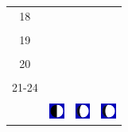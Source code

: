 \documentclass[a4paper,12pt, tikz]{scrartcl}
\begin{document}
\begin{tabularx}{\linewidth}{|c|X|X|X|}
      \hline
      18&   &       &    \\
        &   &       &    \\
      \hline
      19&   &       &    \\
        &   &       &    \\
      \hline
      20&   &       &    \\
        &   &       &    \\
      \hline
      21-24&   &       &    \\
        &   &       &    \\
      \hline  
      & \vspace{0.01cm} \centerline{\includegraphics[width=0.5cm]{moon_phases/Moon_phase_2.svg.png}} \vspace{0.1cm} & \vspace{0.01cm} \centerline{\includegraphics[width=0.5cm]{moon_phases/Moon_phase_3.svg.png}} \vspace{0.1cm} & \vspace{0.01cm} \centerline{\includegraphics[width=0.5cm]{moon_phases/Moon_phase_3.svg.png}} \vspace{0.1cm}\\
      \hline   
    \end{tabularx}




    \newpage

        \noindent
\end{document}
